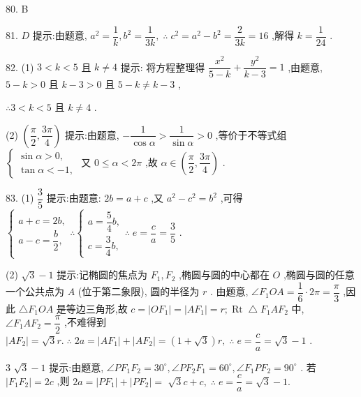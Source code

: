 80. B

81. $D$ 提示:由题意, ${a}^{2} = \dfrac{1}{k},{b}^{2} = \dfrac{1}{3k},\;\therefore \;{c}^{2} = {a}^{2} - {b}^{2} = \dfrac{2}{3k} = {16}$ ,解得 $k = \dfrac{1}{24}$ .

82. (1) $3 < k < 5$ 且 $k \neq  4$ 提示: 将方程整理得 $\dfrac{{x}^{2}}{5 - k} + \dfrac{{y}^{2}}{k - 3} = 1$ ,由题意, $5 - k > 0$ 且 $k - 3 > 0$ 且 $5 - k \neq  k - 3$ ,

$\therefore 3 < k < 5$ 且 $k \neq  4$ .

(2) $\left( {\dfrac{\pi }{2},\dfrac{3\pi }{4}}\right)$ 提示:由题意, $- \dfrac{1}{\cos \alpha } > \dfrac{1}{\sin \alpha } > 0$ ,等价于不等式组 $\left\{  \begin{array}{l} \sin \alpha  > 0, \\  \tan \alpha  <  - 1, \end{array}\right.$ 又 $0 \leq  \alpha  < {2\pi }$ ,故 $\alpha  \in  \left( {\dfrac{\pi }{2},\dfrac{3\pi }{4}}\right)$ .

83. (1) $\dfrac{3}{5}$ 提示:由题意: ${2b} = a + c$ ,又 ${a}^{2} - {c}^{2} = {b}^{2}$ ,可得 $\left\{  {\begin{array}{l} a + c = {2b}, \\  a - c = \dfrac{b}{2}, \end{array}\therefore \left\{  {\begin{array}{l} a = \dfrac{5}{4}b, \\  c = \dfrac{3}{4}b, \end{array}\therefore \;e = \dfrac{c}{a} = \dfrac{3}{5}}\right. }\right.$ .

(2) $\sqrt{3} - 1$ 提示:记椭圆的焦点为 ${F}_{1},{F}_{2}$ ,椭圆与圆的中心都在 $O$ ,椭圆与圆的任意一个公共点为 $A$ (位于第二象限), 圆的半径为 $r$ . 由题意, $\angle {F}_{1}{OA} = \dfrac{1}{6} \cdot  {2\pi } = \dfrac{\pi }{3}$ ,因此 $\bigtriangleup {F}_{1}{OA}$ 是等边三角形,故 $c = \left| {O{F}_{1}}\right|  = \left| {A{F}_{1}}\right|  = r;\operatorname{Rt}\bigtriangleup {F}_{1}A{F}_{2}$ 中, $\angle {F}_{1}A{F}_{2} = \dfrac{\pi }{2}$ ,不难得到 $\left| {A{F}_{2}}\right|  = \sqrt{3}r.\;\therefore \;{2a} = \left| {A{F}_{1}}\right|  + \left| {A{F}_{2}}\right|  = \left( {1 + \sqrt{3}}\right) r,\;\therefore \;e = \dfrac{c}{a} = \sqrt{3} - 1$ .

3 $\sqrt{3} - 1$ 提示:由题意, $\angle P{F}_{1}{F}_{2} = {30}^{ \circ  },\angle P{F}_{2}{F}_{1} = {60}^{ \circ  },\angle {F}_{1}P{F}_{2} = {90}^{ \circ  }$ . 若 $\left| {{F}_{1}{F}_{2}}\right|  = {2c}$ ,则 ${2a} = \left| {P{F}_{1}}\right|  + \left| {P{F}_{2}}\right|  =$  $\sqrt{3}c + c,\;\therefore \;e = \dfrac{c}{a} = \sqrt{3} - 1.$

